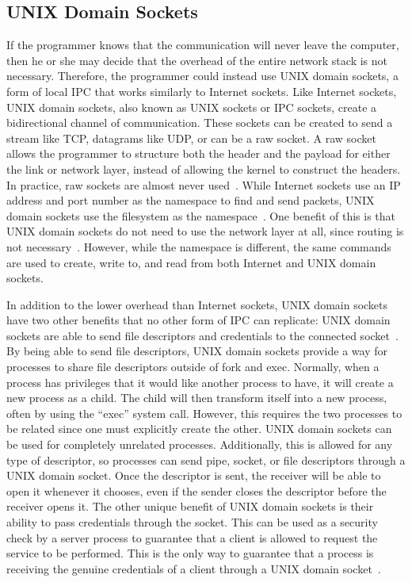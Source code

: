 \subsection{UNIX Domain Sockets}
\label{sec:unixDomainSockets}
If the programmer knows that the communication will never leave the computer, then he or she may decide that the overhead of the entire network stack is not necessary.  Therefore, the programmer could instead use UNIX domain sockets, a form of local IPC that works similarly to Internet sockets.  Like Internet sockets, UNIX domain sockets, also known as UNIX sockets or IPC sockets, create a bidirectional channel of communication.  These sockets can be created to send a stream like TCP, datagrams like UDP, or can be a raw socket.  A raw socket allows the programmer to structure both the header and the payload for either the link or network layer, instead of allowing the kernel to construct the headers.  In practice, raw sockets are almost never used~\cite[p 229--230]{Stevens:1996:TIT:233130}.  While Internet sockets use an IP address and port number as the namespace to find and send packets, UNIX domain sockets use the filesystem as the namespace~\cite[p 231]{Stevens:1996:TIT:233130}.  One benefit of this is that UNIX domain sockets do not need to use the network layer at all, since routing is not necessary~\cite[p 753]{mckusick_neville-neil_watson_2015}.  However, while the namespace is different, the same commands are used to create, write to, and read from both Internet and UNIX domain sockets.

In addition to the lower overhead than Internet sockets, UNIX domain sockets have two other benefits that no other form of IPC can replicate: UNIX domain sockets are able to send file descriptors and credentials to the connected socket~\cite[p 381--394]{Stevens:1997:UNP:522800}.  By being able to send file descriptors, UNIX domain sockets provide a way for processes to share file descriptors outside of fork and exec.  Normally, when a process has privileges that it would like another process to have, it will create a new process as a child.  The child will then transform itself into a new process, often by using the ``exec'' system call.  However, this requires the two processes to be related since one must explicitly create the other.  UNIX domain sockets can be used for completely unrelated processes.  Additionally, this is allowed for any type of descriptor, so processes can send pipe, socket, or file descriptors through a UNIX domain socket.  Once the descriptor is sent, the receiver will be able to open it whenever it chooses, even if the sender closes the descriptor before the receiver opens it.  The other unique benefit of UNIX domain sockets is their ability to pass credentials through the socket.  This can be used as a security check by a server process to guarantee that a client is allowed to request the service to be performed.  This is the only way to guarantee that a process is receiving the genuine credentials of a client through a UNIX domain socket~\cite[p 391]{Stevens:1997:UNP:522800}.

